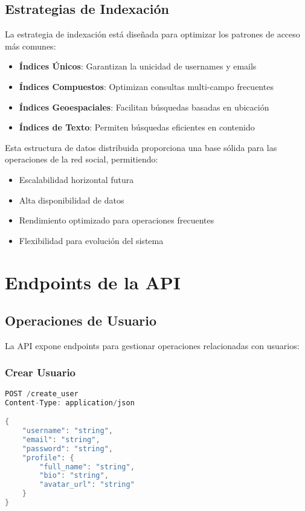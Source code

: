 \documentclass[12pt,letterpaper]{article}
\begin{document}
\subsection{Estrategias de Indexación}
La estrategia de indexación está diseñada para optimizar los patrones de acceso más comunes:

\begin{itemize}
    \item \textbf{Índices Únicos}: Garantizan la unicidad de usernames y emails
    \item \textbf{Índices Compuestos}: Optimizan consultas multi-campo frecuentes
    \item \textbf{Índices Geoespaciales}: Facilitan búsquedas basadas en ubicación
    \item \textbf{Índices de Texto}: Permiten búsquedas eficientes en contenido
\end{itemize}

Esta estructura de datos distribuida proporciona una base sólida para las operaciones de la red social, permitiendo:

\begin{itemize}
    \item Escalabilidad horizontal futura
    \item Alta disponibilidad de datos
    \item Rendimiento optimizado para operaciones frecuentes
    \item Flexibilidad para evolución del sistema
\end{itemize}

\section{Endpoints de la API}
\subsection{Operaciones de Usuario}
La API expone endpoints para gestionar operaciones relacionadas con usuarios:

\subsubsection{Crear Usuario}
\begin{lstlisting}[language=rust]
POST /create_user
Content-Type: application/json

{
    "username": "string",
    "email": "string",
    "password": "string",
    "profile": {
        "full_name": "string",
        "bio": "string",
        "avatar_url": "string"
    }
}
\end{lstlisting}
\end{document}
